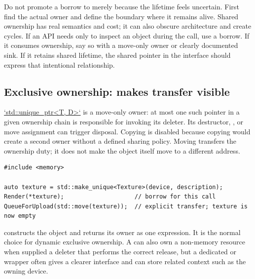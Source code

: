 Do not promote a borrow to  merely because the lifetime feels uncertain. First find the actual owner and define the boundary where it remains alive. Shared ownership has real semantics and cost; it can also obscure architecture and create cycles. If an API needs only to inspect an object during the call, use a borrow. If it consumes ownership, say so with a move-only owner or clearly documented sink. If it retains shared lifetime, the shared pointer in the interface should express that intentional relationship.

\subsection{\texorpdfstring{Exclusive ownership:  makes transfer visible}{Exclusive ownership:  makes transfer visible}}\label{01-foundations-i-ch004-exclusive-ownership-unique_ptr-makes-transfer-visible}

\hypertarget{01-foundations-i-ch004-exclusive-ownership-unique_ptr-makes-transfer-visible}{}

\hyperref[appendix-51602cabe815]{`std::unique\_ptr\textless T, D\textgreater`} is a move-only owner: at most one such pointer in a given ownership chain is responsible for invoking its deleter. Its destructor, , or move assignment can trigger disposal. Copying is disabled because copying would create a second owner without a defined sharing policy. Moving transfers the ownership duty; it does not make the object itself move to a different address.

\begin{verbatim}
#include <memory>

auto texture = std::make_unique<Texture>(device, description);
Render(*texture);                    // borrow for this call
QueueForUpload(std::move(texture));  // explicit transfer; texture is now empty
\end{verbatim}

 constructs the object and returns its owner as one expression. It is the normal choice for dynamic exclusive ownership. A  can also own a non-memory resource when supplied a deleter that performs the correct release, but a dedicated  or  wrapper often gives a clearer interface and can store related context such as the owning device.

